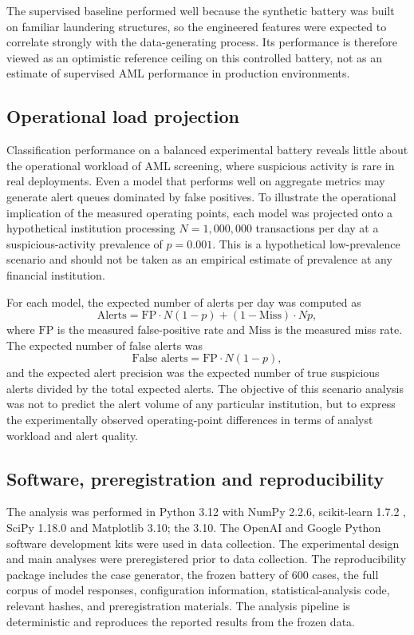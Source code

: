 \documentclass[pdflatex,sn-basic,Numbered]{sn-jnl}
\newcommand{\HLtext}[1]{\texthl{#1}}
\newcommand{\HLdel}[1]{\textcolor{HLink}{\sout{#1}}}
\renewcommand{\HLtext}[1]{#1}\renewcommand{\HLdel}[1]{#1}%
\begin{document}
The supervised baseline performed well because the synthetic battery was built on familiar laundering structures, so the engineered features were expected to correlate strongly with the data-generating process. Its performance is therefore viewed as an optimistic reference ceiling on this controlled battery, not as an estimate of supervised AML performance in production environments.

\subsection{Operational load projection}

Classification performance on a balanced experimental battery reveals little about the operational workload of AML screening, where suspicious activity is rare in real deployments. Even a model that performs well on aggregate metrics may generate alert queues dominated by false positives. To illustrate the operational implication of the measured operating points, each model was projected onto a hypothetical institution processing $N = 1{,}000{,}000$ transactions per day at a suspicious-activity prevalence of $p = 0.001$. This is a hypothetical low-prevalence scenario and should not be taken as an empirical estimate of prevalence at any financial institution.

For each model, the expected number of alerts per day was computed as
\[
\text{Alerts} = \mathrm{FP}\cdot N(1-p) + (1-\mathrm{Miss})\cdot Np,
\]
where $\mathrm{FP}$ is the measured false-positive rate and $\mathrm{Miss}$ is the measured miss rate. The expected number of false alerts was
\[
\text{False alerts} = \mathrm{FP}\cdot N(1-p),
\]
and the expected alert precision was the expected number of true suspicious alerts divided by the total expected alerts. The objective of this scenario analysis was not to predict the alert volume of any particular institution, but to express the experimentally observed operating-point differences in terms of analyst workload and alert quality.

\subsection{Software, preregistration and reproducibility}

The analysis was performed in Python 3.12 with NumPy 2.2.6, scikit-learn 1.7.2 \cite{sklearn}, SciPy 1.18.0 and Matplotlib \HLdel{3.10; the} \HLtext{3.10. The} OpenAI and Google Python software development kits were used in data collection. The experimental design and main analyses were preregistered prior to data collection. The reproducibility package includes the case generator, the frozen battery of 600 cases, the full corpus of model responses, configuration information, statistical-analysis code, relevant hashes, and preregistration materials. The analysis pipeline is deterministic and reproduces the reported results from the frozen data.
\end{document}
